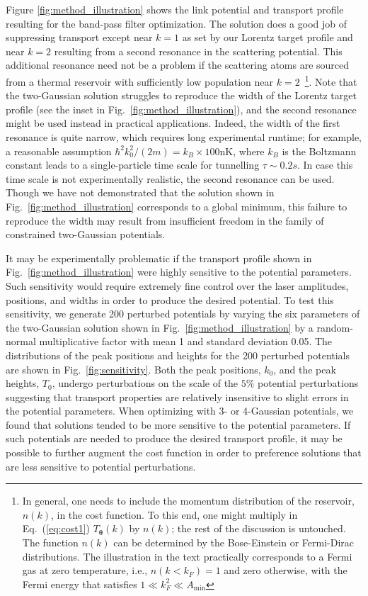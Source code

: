 \documentclass[twocolumn,amsmath,amssymb,showpacs,prl,superscriptaddress,aps]{revtex4-1}
\begin{document}
Figure \ref{fig:method_illustration} shows the link potential and transport profile resulting for the band-pass filter optimization. The solution does a good job of suppressing transport except near $k=1$ as set by our Lorentz target profile and near $k=2$ resulting from a second resonance in the scattering potential. This additional resonance need not be a problem if the scattering atoms are sourced from a thermal reservoir with sufficiently low population near $k=2$~\footnote{In general, one needs to include the momentum distribution of the reservoir, $n(k)$,
in the cost function. To this end, one might multiply in Eq.~(\ref{eq:cost1}) $T_{\bm{\theta}}(k)$ by $n(k)$; the rest of the discussion is untouched.
The function $n(k)$ can be determined by the Bose-Einstein or Fermi-Dirac distributions. The illustration in the text practically corresponds to a Fermi gas 
at zero temperature, i.e., $n(k<k_F)=1$ and zero otherwise, with the Fermi energy that satisfies $1\ll k_F^2 \ll A_\mathrm{min}$}.
 {\color{red}  Note that the two-Gaussian solution struggles to reproduce the width of the Lorentz target profile (see the inset in Fig.~\ref{fig:method_illustration}), and the second resonance might be used instead in practical applications. Indeed, the width of the first resonance is quite narrow, 
which requires long experimental runtime; for example, a reasonable assumption $\hbar^2k_0^2/(2m)=k_B\times 100$nK, where $k_B$ is the Boltzmann constant leads to 
a single-particle time scale for tunnelling $\tau\sim 0.2 s$. In case this time scale is not experimentally realistic, the second resonance 
can be used. Though we have not demonstrated that the solution shown in Fig.~\ref{fig:method_illustration} corresponds to a global minimum, this failure to reproduce the width may result from insufficient freedom in the family of constrained two-Gaussian potentials. }



It may be experimentally problematic if the transport profile shown in Fig.~\ref{fig:method_illustration} were highly sensitive to the potential parameters. Such sensitivity would require extremely fine control over the laser amplitudes, positions, and widths in order to produce the desired potential. To test this sensitivity, we generate 200 perturbed potentials by varying the six parameters of the two-Gaussian solution shown in Fig.~\ref{fig:method_illustration} by a random-normal multiplicative factor with mean 1 and standard deviation 0.05. The distributions of the peak positions and heights for the 200 perturbed potentials are shown in Fig.~\ref{fig:sensitivity}. Both the peak positions, $k_0$, and the peak heights, $T_0$, undergo perturbations on the scale of the $5\%$  potential perturbations suggesting that transport properties are relatively insensitive to slight errors in the potential parameters. When optimizing with 3- or 4-Gaussian potentials, we found that solutions tended to be more sensitive to the potential parameters. If such potentials are needed to produce the desired transport profile, it may be possible to further augment the cost function in order to preference solutions that are less sensitive to potential perturbations.
\end{document}
